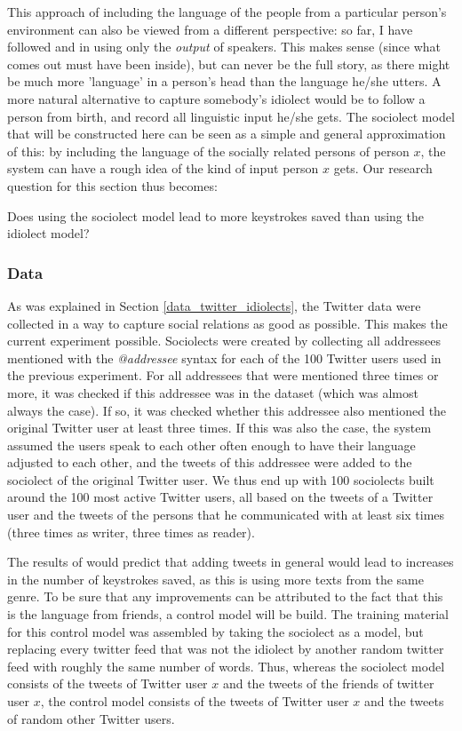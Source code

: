 \documentclass[11pt]{article}
\begin{document}
This approach of including the language of the people from a particular person's environment can also be viewed from a different perspective: so far, I have followed  and  in using only the \emph{output} of speakers. This makes sense (since what comes out must have been inside), but can never be the full story, as there might be much more 'language' in a person's head than the language he/she utters. A more natural alternative to capture somebody's idiolect would be to follow a person from birth, and record all linguistic input he/she gets. The sociolect model that will be constructed here can be seen as a simple and general approximation of this: by including the language of the socially related persons of person $x$, the system can have a rough idea of the kind of input person $x$ gets. Our research question for this section thus becomes:

\begin{examples}
\item Does using the sociolect model lead to more keystrokes saved than using the idiolect model?
\end{examples}

\subsubsection{Data}
As was explained in Section \ref{data_twitter_idiolects}, the Twitter data were collected in a way to capture social relations as good as possible. This makes the current experiment possible. Sociolects were created by collecting all addressees mentioned with the \emph{@addressee} syntax for each of the 100 Twitter users used in the previous experiment. For all addressees that were mentioned three times or more, it was checked if this addressee was in the dataset (which was almost always the case). If so, it was checked whether this addressee also mentioned the original Twitter user at least three times. If this was also the case, the system assumed the users speak to each other often enough to have their language adjusted to each other, and the tweets of this addressee were added to the sociolect of the original Twitter user. We thus end up with 100 sociolects built around the 100 most active Twitter users, all based on the tweets of a Twitter user and the tweets of the persons that he communicated with at least six times (three times as writer, three times as reader).

The results of  would predict that adding tweets in general would lead to increases in the number of keystrokes saved, as this is using more texts from the same genre. To be sure that any improvements can be attributed to the fact that this is the language from friends, a control model will be build. The training material for this control model was assembled by taking the sociolect as a model, but replacing every twitter feed that was not the idiolect by another random twitter feed with roughly the same number of words. Thus, whereas the sociolect model consists of the tweets of Twitter user $x$ and the tweets of the friends of twitter user $x$, the control model consists of the tweets of Twitter user $x$ and the tweets of random other Twitter users.
\end{document}
